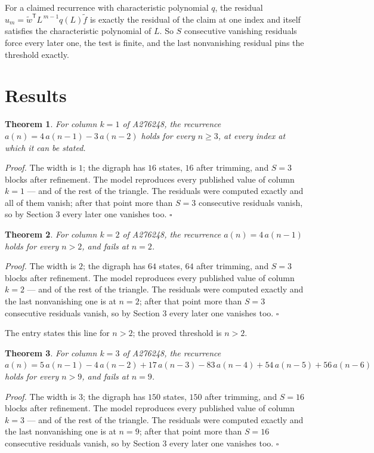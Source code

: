 \documentclass[11pt]{article}
\newtheorem{theorem}{Theorem}
\theoremstyle{definition}
\begin{document}
For a claimed recurrence with characteristic polynomial $q$, the residual $u_m = \tilde w^{\mathsf T}L^{\,m-1}q(L)\tilde f$ is exactly the residual of the claim at one index and itself satisfies the characteristic polynomial of $L$. So $S$ consecutive vanishing residuals force every later one, the test is finite, and the last nonvanishing residual pins the threshold exactly.

\section{Results}

\begin{theorem} For column $k = 1$ of A276248, the recurrence $a(n) = 4\,a(n-1) - 3\,a(n-2)$ holds for every $n \ge 3$, at every index at which it can be stated.\end{theorem}

{\itshape Proof.} The width is $1$; the digraph has $16$ states, $16$ after trimming, and $S = 3$ blocks after refinement. The model reproduces every published value of column $k = 1$ --- and of the rest of the triangle. The residuals were computed exactly and all of them vanish; after that point more than $S = 3$ consecutive residuals vanish, so by Section 3 every later one vanishes too. $\square$

\begin{theorem} For column $k = 2$ of A276248, the recurrence $a(n) = 4\,a(n-1)$ holds for every $n > 2$, and fails at $n = 2$.\end{theorem}

{\itshape Proof.} The width is $2$; the digraph has $64$ states, $64$ after trimming, and $S = 3$ blocks after refinement. The model reproduces every published value of column $k = 2$ --- and of the rest of the triangle. The residuals were computed exactly and the last nonvanishing one is at $n = 2$; after that point more than $S = 3$ consecutive residuals vanish, so by Section 3 every later one vanishes too. $\square$

The entry states this line for $n > 2$; the proved threshold is $n > 2$.

\begin{theorem} For column $k = 3$ of A276248, the recurrence $a(n) = 5\,a(n-1) - 4\,a(n-2) + 17\,a(n-3) - 83\,a(n-4) + 54\,a(n-5) + 56\,a(n-6)$ holds for every $n > 9$, and fails at $n = 9$.\end{theorem}

{\itshape Proof.} The width is $3$; the digraph has $150$ states, $150$ after trimming, and $S = 16$ blocks after refinement. The model reproduces every published value of column $k = 3$ --- and of the rest of the triangle. The residuals were computed exactly and the last nonvanishing one is at $n = 9$; after that point more than $S = 16$ consecutive residuals vanish, so by Section 3 every later one vanishes too. $\square$
\end{document}

